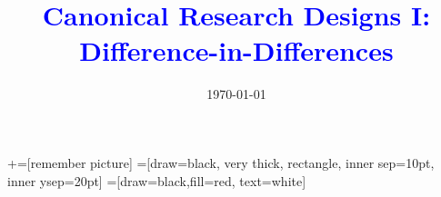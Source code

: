 \documentclass[notes,11pt, aspectratio=169]{beamer}
\title[]{\textcolor{blue}{Canonical Research Designs I:\\ Difference-in-Differences}}
\author[PGP]{}
\institute[FRBNY]{\small{\begin{tabular}{c}
  Paul Goldsmith-Pinkham  \\
\end{tabular}}}
\date{\today}
\begin{document}
\newcommand\marktopleft[1]{%
    \tikz[overlay,remember picture] 
        \node (marker-#1-a) at (-.3em,.3em) {};%
}
\newcommand\markbottomright[2]{%
    \tikz[overlay,remember picture] 
        \node (marker-#1-b) at (0em,0em) {};%
}
+=[remember picture] 
 =[draw=black, very thick, rectangle, inner sep=10pt, inner ysep=20pt]
 =[draw=black,fill=red, text=white]

\begin{frame}
\maketitle
\end{frame}
\end{document}
